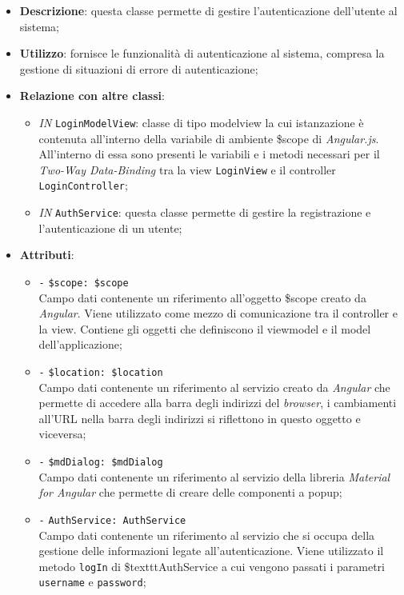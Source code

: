 \begin{itemize}
	\item \textbf{Descrizione}: questa classe permette di gestire l'autenticazione dell'utente al sistema; 
	\item \textbf{Utilizzo}: fornisce le funzionalità di autenticazione al sistema, compresa la gestione di situazioni di errore di autenticazione;
	\item \textbf{Relazione con altre classi}:
	\begin{itemize}
		\item \textit{IN} \texttt{LoginModelView}: classe di tipo modelview la cui istanzazione è contenuta all'interno della variabile di ambiente \$scope di \textit{Angular.js}. All'interno di essa sono presenti le variabili e i metodi necessari per il \textit{Two-Way Data-Binding} tra la view \texttt{LoginView} e il controller \texttt{LoginController};
		\item \textit{IN} \texttt{AuthService}: questa classe permette di gestire la registrazione e l'autenticazione di un utente;
	\end{itemize}
	\item \textbf{Attributi}:
	\begin{itemize}
		\item \texttt{-} \texttt{\$scope: \$scope} \\
		Campo dati contenente un riferimento all’oggetto \$scope creato da \textit{Angular}. Viene utilizzato come mezzo di comunicazione tra il controller e la view. Contiene gli oggetti che definiscono il viewmodel e il model dell’applicazione;
		\item \texttt{-} \texttt{\$location: \$location} \\
		Campo dati contenente un riferimento al servizio creato da \textit{Angular} che permette di accedere alla barra degli indirizzi del \textit{browser}, i cambiamenti all’URL nella barra degli indirizzi si riflettono in questo oggetto e viceversa;
		\item \texttt{-} \texttt{\$mdDialog: \$mdDialog} \\
		Campo dati contenente un riferimento al servizio della libreria \textit{Material for Angular} che permette di creare delle componenti a popup;
		\item \texttt{-} \texttt{AuthService: AuthService} \\
		Campo dati contenente un riferimento al servizio che si occupa della gestione delle informazioni legate all’autenticazione. Viene utilizzato il metodo \texttt{logIn} di \$texttt{AuthService} a cui vengono passati i parametri \texttt{username} e \texttt{password};

\end{itemize}
\end{itemize}
